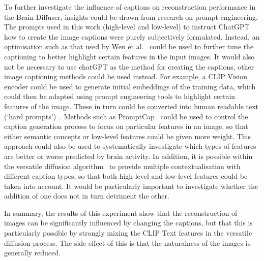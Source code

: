 To further investigate the influence of captions on reconstruction performance in the Brain-Diffuser, insights could be drawn from research on prompt engineering. The prompts used in this work (high-level and low-level) to instruct ChatGPT how to create the image captions were purely subjectively formulated. Instead, an optimisation such as that used by Wen et al.~\cite{wenHardPromptsMade2023} could be used to further tune the captioning to better highlight certain features in the input images. It would also not be necessary to use chatGPT as the method for creating the captions, other image captioning methods could be used instead. For example, a CLIP Vision encoder could be used to generate initial embeddings of the training data, which could then be adapted using prompt engineering tools to highlight certain features of the image. These in turn could be converted into human readable text (`hard prompts')~\cite{wenHardPromptsMade2023}. Methods such as PromptCap~\cite{Hu_2023_ICCV} could be used to control the caption generation process to focus on particular features in an image, so that either semantic concepts or low-level features could be given more weight. This approach could also be used to systematically investigate which types of features are better or worse predicted by brain activity.  In addition, it is possible within the versatile diffusion algorithm~\cite{xuVersatileDiffusionText2024} to provide multiple contextualisation with different caption types, so that both high-level and low-level features could be taken into account. It would be particularly important to investigate whether the addition of one does not in turn detriment the other. 

In summary, the results of this experiment show that the reconstruction of images can be significantly influenced by changing the captions, but that this is particularly possible by strongly mixing the CLIP Text features in the versatile diffusion process. The side effect of this is that the naturalness of the images is generally reduced. 

